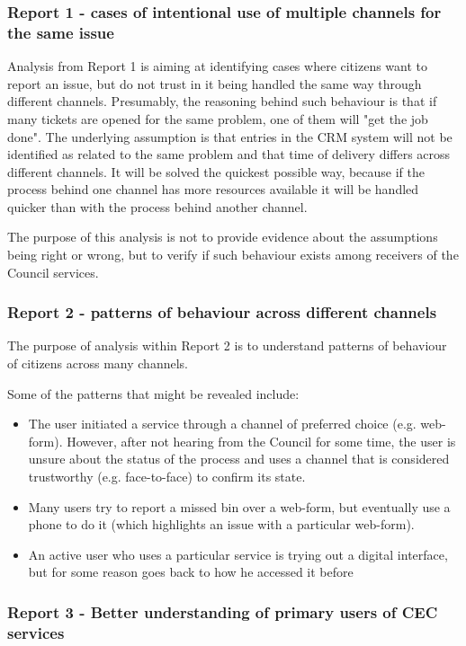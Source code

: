 			\subsubsection{Report 1 - cases of intentional use of multiple channels for the same issue}
			
Analysis from Report 1 is aiming at identifying cases where citizens want to report an issue, but do not trust in it being handled the same way through different channels. Presumably, the reasoning behind such behaviour is that if many tickets are opened for the same problem, one of them will "get the job done". The underlying assumption is that entries in the CRM system will not be identified as related to the same problem and that time of delivery differs across different channels. It will be solved the quickest possible way, because if the process behind one channel has more resources available it will be handled quicker than with the process behind another channel.

The purpose of this analysis is not to provide evidence about the assumptions being right or wrong, but to verify if such behaviour exists among receivers of the Council services.
			
			\subsubsection{Report 2 - patterns of behaviour across different channels}
			
The purpose of analysis within Report 2 is to understand patterns of behaviour of citizens across many channels.

Some of the patterns that might be revealed include:
\begin{itemize}
\item The user initiated a service through a channel of preferred choice (e.g. web-form). However, after not hearing from the Council for some time, the user is unsure about the status of the process and uses a channel that is considered trustworthy (e.g. face-to-face) to confirm its state.
\item Many users try to report a missed bin over a web-form, but eventually use a phone to do it (which highlights an issue with a particular web-form).
\item An active user who uses a particular service is trying out a digital interface, but for some reason goes back to how he accessed it before
\end{itemize}	
			
			\subsubsection{Report 3 - Better understanding of primary users of CEC services}
			
